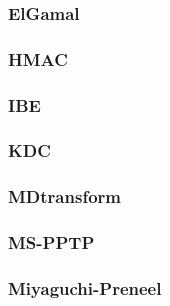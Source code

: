 \begin{frame}\frametitle{ElGamal}
\begin{figure}
\begin{center}

\end{center}
\end{figure}
\end{frame}
\begin{frame}\frametitle{HMAC}
\begin{figure}
\begin{center}

\end{center}
\end{figure}
\end{frame}
\begin{frame}\frametitle{IBE}
\begin{figure}
\begin{center}

\end{center}
\end{figure}
\end{frame}
\begin{frame}\frametitle{KDC}
\begin{figure}
\begin{center}

\end{center}
\end{figure}
\end{frame}
\begin{frame}\frametitle{MDtransform}
\begin{figure}
\begin{center}

\end{center}
\end{figure}
\end{frame}
\begin{frame}\frametitle{MS-PPTP}
\begin{figure}
\begin{center}

\end{center}
\end{figure}
\end{frame}
\begin{frame}\frametitle{Miyaguchi-Preneel}
\begin{figure}
\begin{center}

\end{center}
\end{figure}
\end{frame}
